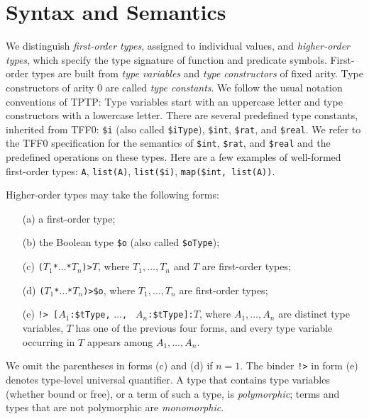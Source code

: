 \section{Syntax and Semantics} \label{sec_logic}

We distinguish {\em first-order types}, assigned
to individual values, and {\em higher-order types\/},
which specify the type signature of function and predicate symbols.
%
First-order types are built from {\em type variables\/}
and {\em type constructors\/} of fixed arity. Type constructors
of arity 0 are called {\em type constants}. We follow the usual
notation conventions of TPTP: Type variables start with an
uppercase letter and type constructors with a lowercase letter.
There are several predefined type constants, inherited from TFF0:
\verb+$i+ (also called \verb+$iType+),
\verb+$int+, \verb+$rat+, and \verb+$real+. We refer to the TFF0
specification \cite{TFF0} for the semantics of
\verb+$int+, \verb+$rat+, and \verb+$real+ and the predefined operations on
these types. %
Here are a few examples of well-formed first-order types:
\verb+A+, \verb+list(A)+, \verb+list($i)+, \verb+map($int,+~\verb+list(A))+.

Higher-order types may take the following forms:
%
\begin{enumerate}
\item[(a)] a first-order type;
\item[(b)] the Boolean type \verb+$o+ (also called \verb+$oType+);
\item[(c)] {\tt ($T_1$\;*\;${\dots}$\;*\;$T_n$)\;>\;$T$},
where $T_1,\dots,T_n$ and $T$ are first-order types;
\item[(d)] {\tt ($T_1$\;*\;${\dots}$\;*\;$T_n$)\;>\;\$o},
where $T_1,\dots,T_n$ are first-order types;
\item[(e)] {\tt !>\ [$A_1$\;:\;\$tType,} {\tt ${\dots}$,} {\tt
$A_n$\;:\;\$tType]:\;$T$}, where $A_1,\dots,A_n$ are distinct type variables, $T$
has one of the previous four forms, and every type variable occurring in $T$
appears among $A_1,\dots,A_n$.
\end{enumerate}
%
We omit the parentheses in forms (c) and (d) if $n = 1$. The binder {\tt !>} in
form (e) denotes type-level universal quantifier.
%
A type that contains type variables (whether bound or free), or a term of such a
type, is {\em polymorphic}; terms and types that are not polymorphic are {\em
monomorphic}.

